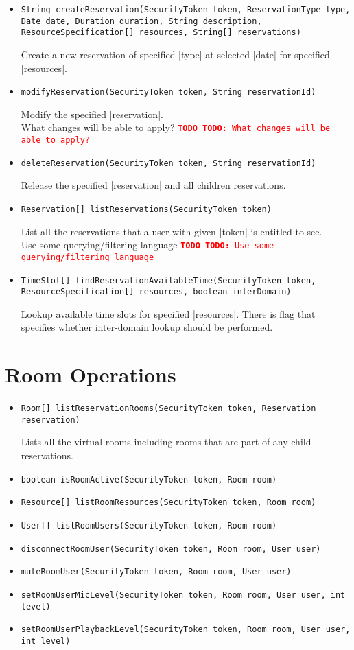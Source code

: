 \documentclass[a4paper]{report}
\newcommand{\APIcmd}[1]{%
\item \lstinline[style=myinline]!#1!%

}
\newenvironment{APIdef}{\begin{itemize}}{\end{itemize}}
\newcommand{\TODO}[1]{%
\def\empty{}%
\def\prvniparametr{#1}%
\ifx\prvniparametr\empty%
\begingroup\tt\textcolor{red}{\noindent\textbf{TODO}}\endgroup
\else%
\begingroup\tt\textcolor{red}{\noindent\textbf{TODO:}\ #1}\endgroup
\fi%
}
\begin{document}
\begin{APIdef}

\APIcmd{String createReservation(SecurityToken token, ReservationType type, Date date, Duration duration, String description, ResourceSpecification[] resources, String[] reservations)}
Create a new reservation of specified |type| at selected |date| for specified |resources|.

\APIcmd{modifyReservation(SecurityToken token, String reservationId)}
Modify the specified |reservation|.
\\ \TODO{What changes will be able to apply?}

\APIcmd{deleteReservation(SecurityToken token, String reservationId)}
Release the specified |reservation| and all children reservations.

\APIcmd{Reservation[] listReservations(SecurityToken token)}
List all the reservations that a user with given |token| is entitled to see.
\\ \TODO{Use some querying/filtering language}

\APIcmd{TimeSlot[] findReservationAvailableTime(SecurityToken token, ResourceSpecification[] resources, boolean interDomain)}
Lookup available time slots for specified |resources|. There is flag that specifies whether inter-domain lookup should be performed.


\end{APIdef}


\section{Room Operations}

\begin{APIdef}

\APIcmd{Room[] listReservationRooms(SecurityToken token, Reservation reservation)}

Lists all the virtual rooms including rooms that are part of any child reservations.

\APIcmd{boolean isRoomActive(SecurityToken token, Room room)}

\APIcmd{Resource[] listRoomResources(SecurityToken token, Room room)}

\APIcmd{User[] listRoomUsers(SecurityToken token, Room room)}

\APIcmd{disconnectRoomUser(SecurityToken token, Room room, User user)}

\APIcmd{muteRoomUser(SecurityToken token, Room room, User user)}

\APIcmd{setRoomUserMicLevel(SecurityToken token, Room room, User user, int level)}

\APIcmd{setRoomUserPlaybackLevel(SecurityToken token, Room room, User user, int level)}

\end{APIdef}
\end{document}
